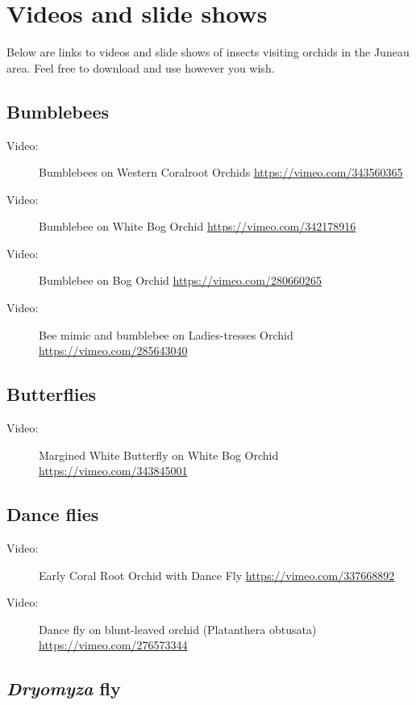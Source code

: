 \section{Videos and slide shows}\label{videos}

Below are links to videos and slide shows of insects visiting orchids in the Juneau area. Feel free to download and use however you wish.

\subsection{Bumblebees}
\begin{description}
\item[Video:]  Bumblebees on Western Coralroot Orchids \url{https://vimeo.com/343560365}
\item[Video:]   Bumblebee on White Bog Orchid \url{https://vimeo.com/342178916}
\item[Video:]   Bumblebee on Bog Orchid \url{https://vimeo.com/280660265}
\item[Video:]   Bee mimic and bumblebee on Ladies-tresses Orchid \url{https://vimeo.com/285643040}
\end{description}

\subsection{Butterflies}

\begin{description}
\item[Video:]  Margined White Butterfly on White Bog Orchid  \url{https://vimeo.com/343845001}
\end{description}

\subsection{Dance flies}

\begin{description}
\item[Video:]  Early Coral Root Orchid with Dance Fly \url{https://vimeo.com/337668892} 
\item[Video:]  Dance fly on blunt-leaved orchid (Platanthera obtusata) \url{https://vimeo.com/276573344} 
\end{description}

\subsection{\emph{Dryomyza} fly}

